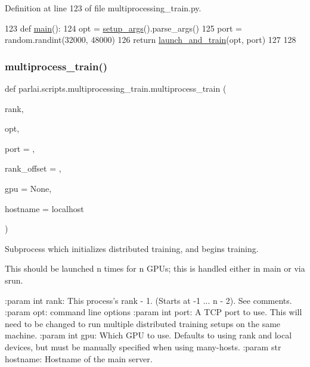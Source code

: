 Definition at line 123 of file multiprocessing\+\_\+train.\+py.


\begin{DoxyCode}
123 \textcolor{keyword}{def }\hyperlink{namespaceparlai_1_1scripts_1_1multiprocessing__train_aa7b2a133561ac5212f3ee9814a645522}{main}():
124     opt = \hyperlink{namespaceparlai_1_1scripts_1_1multiprocessing__train_a1ee26bddeb470040cfbceb5ee7a9fa08}{setup\_args}().parse\_args()
125     port = random.randint(32000, 48000)
126     \textcolor{keywordflow}{return} \hyperlink{namespaceparlai_1_1scripts_1_1multiprocessing__train_a5dc8df166f1c025b54f7420a1ab2f812}{launch\_and\_train}(opt, port)
127 
128 
\end{DoxyCode}
\mbox{\label{namespaceparlai_1_1scripts_1_1multiprocessing__train_aa979267c9eb44bbdfcd25a6d69a58cc4}} 
\subsubsection{\texorpdfstring{multiprocess\+\_\+train()}{multiprocess\_train()}}
{\footnotesize\ttfamily def parlai.\+scripts.\+multiprocessing\+\_\+train.\+multiprocess\+\_\+train (\begin{DoxyParamCaption}\item[{}]{rank,  }\item[{}]{opt,  }\item[{}]{port = {},  }\item[{}]{rank\+\_\+offset = {},  }\item[{}]{gpu = {\ttfamily None},  }\item[{}]{hostname = {\ttfamily \textquotesingle{}localhost\textquotesingle{}} }\end{DoxyParamCaption})}

\begin{DoxyVerb}Subprocess which initializes distributed training, and begins training.

This should be launched n times for n GPUs; this is handled either in main
or via srun.

:param int rank: This process's rank - 1. (Starts at -1 ... n - 2). See comments.
:param opt: command line options
:param int port: A TCP port to use. This will need to be changed to run
    multiple distributed training setups on the same machine.
:param int gpu: Which GPU to use. Defaults to using rank and local devices,
    but must be manually specified when using many-hosts.
:param str hostname: Hostname of the main server.
\end{DoxyVerb}
 

